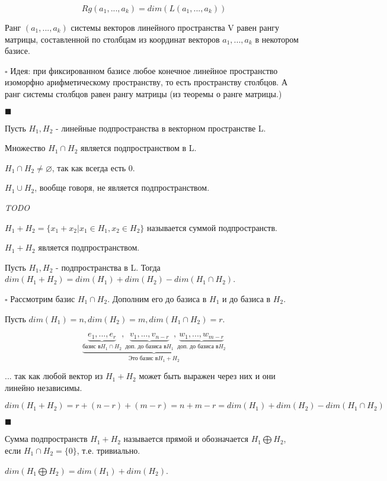 \documentclass[../main.tex]{subfiles}
\begin{document}
$$Rg(a_1,...,a_k) = dim(L(a_1,...,a_k))$$

\void{} Ранг $(a_1,...,a_k)$ системы векторов линейного пространства V равен рангу матрицы,
составленной по столбцам из координат векторов $a_1,...,a_k$ в некотором базисе.

\void $\square$ Идея: при фиксированном базисе любое конечное линейное пространство изоморфно арифметическому
пространству, то есть пространству столбцов. А ранг системы столбцов равен рангу матрицы (из теоремы о ранге матрицы.)

$\blacksquare$

\void
Пусть $H_1, H_2$ - линейные подпространства в векторном пространстве L.

\void{} Множество $H_1\cap H_2$ является подпространством в L.

\void{} $H_1\cap H_2\neq \varnothing$, так как всегда есть 0.

\void{} $H_1\cup H_2$, вообще говоря, не является подпространством.

\void{} \textit{TODO}

\void{} $H_1 + H_2 = \{x_1 + x_2\vert x_1\in H_1, x_2\in H_2\}$ называется суммой подпространств.

\void{} $H_1 + H_2$ является подпространством.

\void{} Пусть $H_1, H_2$ - подпространства в L. Тогда $dim(H_1+H_2) = dim(H_1) + dim(H_2) - dim(H_1\cap H_2)$.

\void $\square$ Рассмотрим базис $H_1\cap H_2$. Дополним его до базиса в $H_1$ и до базиса в $H_2$.

Пусть $dim(H_1) = n, dim(H_2) = m, dim(H_1\cap H_2) = r.$

$$\underbrace{\underbrace{e_1,...,e_r}_{\text{базис в} H_1\cap H_2}, 
\underbrace{v_1,...,v_{n-r}}_{\text{доп. до базиса в} H_1},
\underbrace{w_1,...,w_{m-r}}_{\text{доп. до базиса в} H_2}}_{\text{Это базис в} H_1 + H_2}$$

... так как любой вектор из $H_1 + H_2$ может быть выражен через них и они линейно независимы.

$$dim(H_1+H_2) = r + (n - r) + (m - r) = n + m - r = dim(H_1) + dim(H_2) - dim(H_1\cap H_2)$$

$\blacksquare$

\void{} Сумма подпространств $H_1+H_2$ называется прямой и обозначается $H_1\bigoplus H_2$, если
$H_1\cap H_2 = \{0\}$, т.е. тривиально.

\void{} $dim(H_1\bigoplus H_2) = dim(H_1) + dim(H_2)$.
\end{document}
